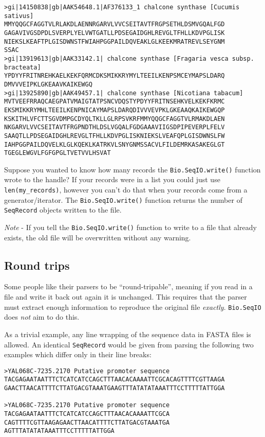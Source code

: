 \begin{verbatim}
>gi|14150838|gb|AAK54648.1|AF376133_1 chalcone synthase [Cucumis sativus]
MMYQQGCFAGGTVLRLAKDLAENNRGARVLVVCSEITAVTFRGPSETHLDSMVGQALFGD
GAGAVIVGSDPDLSVERPLYELVWTGATLLPDSEGAIDGHLREVGLTFHLLKDVPGLISK
NIEKSLKEAFTPLGISDWNSTFWIAHPGGPAILDQVEAKLGLKEEKMRATREVLSEYGNM
SSAC
>gi|13919613|gb|AAK33142.1| chalcone synthase [Fragaria vesca subsp. bracteata]
YPDYYFRITNREHKAELKEKFQRMCDKSMIKKRYMYLTEEILKENPSMCEYMAPSLDARQ
DMVVVEIPKLGKEAAVKAIKEWGQ
>gi|13925890|gb|AAK49457.1| chalcone synthase [Nicotiana tabacum]
MVTVEEFRRAQCAEGPATVMAIGTATPSNCVDQSTYPDYYFRITNSEHKVELKEKFKRMC
EKSMIKKRYMHLTEEILKENPNICAYMAPSLDARQDIVVVEVPKLGKEAAQKAIKEWGQP
KSKITHLVFCTTSGVDMPGCDYQLTKLLGLRPSVKRFMMYQQGCFAGGTVLRMAKDLAEN
NKGARVLVVCSEITAVTFRGPNDTHLDSLVGQALFGDGAAAVIIGSDPIPEVERPLFELV
SAAQTLLPDSEGAIDGHLREVGLTFHLLKDVPGLISKNIEKSLVEAFQPLGISDWNSLFW
IAHPGGPAILDQVELKLGLKQEKLKATRKVLSNYGNMSSACVLFILDEMRKASAKEGLGT
TGEGLEWGVLFGFGPGLTVETVVLHSVAT
\end{verbatim}

Suppose you wanted to know how many records the \verb|Bio.SeqIO.write()| function wrote to the handle?
If your records were in a list you could just use \verb|len(my_records)|, however you can't do that when your records come from a generator/iterator.  The \verb|Bio.SeqIO.write()| function returns the number of \verb|SeqRecord| objects written to the file.

\emph{Note} - If you tell the \verb|Bio.SeqIO.write()| function to write to a file that already exists, the old file will be overwritten without any warning.

\subsection{Round trips}

Some people like their parsers to be ``round-tripable'', meaning if you read in
a file and write it back out again it is unchanged. This requires that the parser
must extract enough information to reproduce the original file \emph{exactly}.
\verb|Bio.SeqIO| does \emph{not} aim to do this.

As a trivial example, any line wrapping of the sequence data in FASTA files is
allowed. An identical \verb|SeqRecord| would be given from parsing the following
two examples which differ only in their line breaks:

\begin{verbatim}
>YAL068C-7235.2170 Putative promoter sequence
TACGAGAATAATTTCTCATCATCCAGCTTTAACACAAAATTCGCACAGTTTTCGTTAAGA
GAACTTAACATTTTCTTATGACGTAAATGAAGTTTATATATAAATTTCCTTTTTATTGGA

>YAL068C-7235.2170 Putative promoter sequence
TACGAGAATAATTTCTCATCATCCAGCTTTAACACAAAATTCGCA
CAGTTTTCGTTAAGAGAACTTAACATTTTCTTATGACGTAAATGA
AGTTTATATATAAATTTCCTTTTTATTGGA
\end{verbatim}

